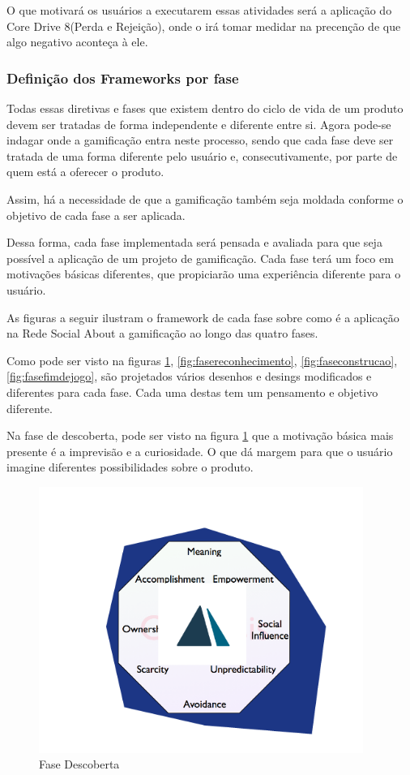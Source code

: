 O que motivará os usuários a executarem essas atividades será a aplicação 
do Core Drive 8(Perda e Rejeição), onde o irá tomar medidar na precenção de
que algo negativo aconteça à ele.


\subsubsection{Definição dos Frameworks por fase}
\label{sub:fim_de_jogo}
Todas essas diretivas e fases que existem dentro do ciclo de vida de um produto devem ser
tratadas de forma independente e diferente entre si. Agora pode-se indagar onde a gamificação
entra neste processo, sendo que cada fase deve ser tratada de uma forma diferente pelo
usuário e, consecutivamente, por parte de quem está a oferecer o produto.

Assim, há a necessidade de que a gamificação também seja moldada conforme o objetivo de
cada fase a ser aplicada.

Dessa forma, cada fase implementada será pensada e avaliada para que seja possível a
aplicação de um  projeto de gamificação. Cada fase terá um foco em motivações
básicas diferentes, que propiciarão uma experiência diferente para o usuário.

As figuras a seguir ilustram o framework de cada fase sobre como é a aplicação na
Rede Social About a gamificação ao longo das quatro fases.

Como pode ser visto na figuras \ref{fig:fasedescoberta}, \ref{fig:fasereconhecimento}, \ref{fig:faseconstrucao}, 
\ref{fig:fasefimdejogo}, são projetados vários
desenhos e desings modificados e diferentes para cada fase. Cada uma destas
tem um pensamento e objetivo diferente.

Na fase de descoberta, pode ser visto na figura \ref{fig:fasedescoberta} que a motivação básica mais presente é
a imprevisão e a curiosidade. O que dá margem para que o usuário imagine diferentes
possibilidades sobre o produto. 

\begin{figure}[h]
    \centering
    \includegraphics[width=400px, scale=1]{figuras/fasedescoberta}
    \caption{Fase Descoberta}
    \label{fig:fasedescoberta}
\end{figure}


